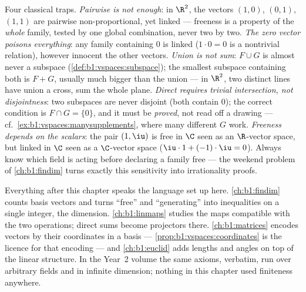 \begin{remark}
\label{rem:b1:vspaces:pitfalls}
Four classical traps.
\emph{Pairwise is not enough}: in $\R^2$, the vectors $(1,0)$,
$(0,1)$, $(1,1)$ are pairwise non-proportional, yet linked ---
freeness is a property of the \emph{whole} family, tested by one
global combination, never two by two.
\emph{The zero vector poisons everything}: any family containing
$0$ is linked ($1\cdot 0 = 0$ is a nontrivial relation), however
innocent the other vectors.
\emph{Union is not sum}: $F \cup G$ is almost never a subspace
(\cref{def:b1:vspaces:subspace}); the smallest subspace
containing both is $F + G$, usually much bigger than the union
--- in $\R^2$, two distinct lines have union a cross, sum the
whole plane.
\emph{Direct requires trivial intersection, not disjointness}:
two subspaces are never disjoint (both contain $0$); the correct
condition is $F \cap G = \{0\}$, and it must be \emph{proved},
not read off a drawing --- cf.\
\cref{ex:b1:vspaces:manysupplements}, where many different $G$
work.
\emph{Freeness depends on the scalars}: the pair $(1, \iu)$ is
free in $\C$ seen as an $\R$-vector space, but linked in $\C$
seen as a $\C$-vector space ($\iu\cdot 1 + (-1)\cdot\iu = 0$).
Always know which field is acting before declaring a family free
--- the weekend problem of \cref{ch:b1:findim} turns exactly
this sensitivity into irrationality proofs.
\end{remark}

\begin{remark}
\label{rem:b1:vspaces:whereused}
Everything after this chapter speaks the language set up here.
\cref{ch:b1:findim} counts basis vectors and turns ``free'' and
``generating'' into inequalities on a single integer, the
dimension. \cref{ch:b1:linmaps} studies the maps compatible with
the two operations; direct sums become projectors there.
\cref{ch:b1:matrices} encodes vectors by their coordinates in a
basis --- \cref{prop:b1:vspaces:coordinates} is the licence for
that encoding --- and \cref{ch:b1:euclid} adds lengths and angles
on top of the linear structure. In the Year~2 volume the same
axioms, verbatim, run over arbitrary fields and in infinite
dimension; nothing in this chapter used finiteness anywhere.
\end{remark}

